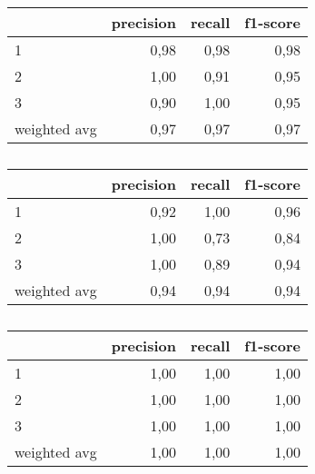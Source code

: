 \begin{table}
\centering
\caption{}%
\begin{tabular}{lrrr}
\toprule
{} &  precision &  recall &  f1-score \\
\midrule
1            &       0,98 &    0,98 &      0,98 \\
2            &       1,00 &    0,91 &      0,95 \\
3            &       0,90 &    1,00 &      0,95 \\
weighted avg &       0,97 &    0,97 &      0,97 \\
\bottomrule
\end{tabular}
\end{table}

\begin{table}
\centering
\caption{}%
\begin{tabular}{lrrr}
\toprule
{} &  precision &  recall &  f1-score \\
\midrule
1            &       0,92 &    1,00 &      0,96 \\
2            &       1,00 &    0,73 &      0,84 \\
3            &       1,00 &    0,89 &      0,94 \\
weighted avg &       0,94 &    0,94 &      0,94 \\
\bottomrule
\end{tabular}
\end{table}

\begin{table}
\centering
\caption{}%
\begin{tabular}{lrrr}
\toprule
{} &  precision &  recall &  f1-score \\
\midrule
1            &       1,00 &    1,00 &      1,00 \\
2            &       1,00 &    1,00 &      1,00 \\
3            &       1,00 &    1,00 &      1,00 \\
weighted avg &       1,00 &    1,00 &      1,00 \\
\bottomrule
\end{tabular}
\end{table}

